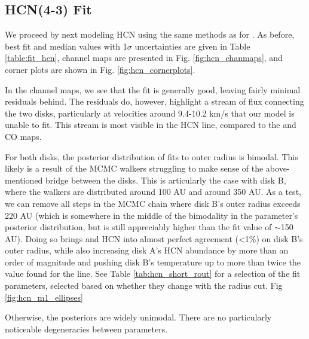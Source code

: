 \subsection{HCN(4-3) Fit}
\label{subsection:hcn_fit}

We proceed by next modeling HCN using the same methods as for \hco. As before, best fit and median values with 1$\sigma$  uncertainties are given in Table \ref{table:fit_hcn}, channel maps are presented in Fig. \ref{fig:hcn_chanmaps}, and corner plots are shown in Fig. \ref{fig:hcn_cornerplots}.

In the channel maps, we see that the fit is generally good, leaving fairly minimal residuals behind. The residuals do, however, highlight a stream of flux connecting the two disks, particularly at velocities around 9.4-10.2 km/s that our model is unable to fit. This stream is most visible in the HCN line, compared to the \hco and CO maps.

For both disks, the posterior distribution of fits to outer radius is bimodal. This likely is a result of the MCMC walkers struggling to make sense of the above-mentioned bridge between the disks. This is articularly the case with disk B, where the walkers are distributed around 100 AU and around 350 AU. As a test, we can remove all steps in the MCMC chain where disk B's outer radius exceeds 220 AU (which is somewhere in the middle of the bimodality in the parameter's posterior distribution, but is still appreciably higher than the \hco fit value of $\sim$150 AU). Doing so brings \hco and HCN into almost perfect agreement (\textless 1\%) on disk B's outer radius, while also increasing disk A's HCN abundance by more than an order of magnitude and pushing disk B's temperature up to more than twice the value found for the \hco line. See Table \ref{tab:hcn_short_rout} for a selection of the fit parameters, selected based on whether they change with the radius cut. Fig \ref{fig:hcn_m1_ellipses}

Otherwise, the posteriors are widely unimodal. There are no particularly noticeable degeneracies between parameters.



